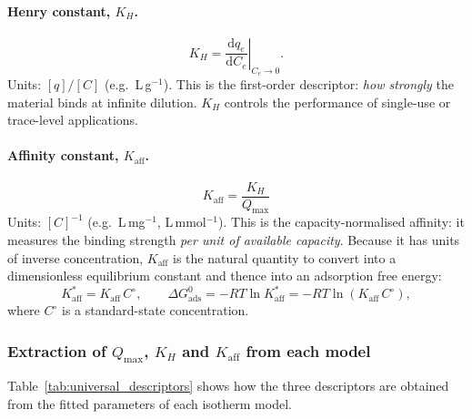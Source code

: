 	\paragraph{Henry constant, $K_H$.}
	\begin{equation}
		K_H = \left.\frac{\mathrm{d}q_e}{\mathrm{d}C_e}
		\right|_{C_e \to 0}.
		\label{eq:KH_universal}
	\end{equation}
	Units: $[q]/[C]$ (e.g.\ L\,g$^{-1}$).
	This is the first-order descriptor: \emph{how strongly} the
	material binds at infinite dilution.  $K_H$ controls the
	performance of single-use or trace-level applications.

	\paragraph{Affinity constant, $K_{\mathrm{aff}}$.}
	\begin{equation}
		\boxed{
			K_{\mathrm{aff}}
			= \frac{K_H}{Q_{\max}}
		}
		\label{eq:Kaff_universal}
	\end{equation}
	Units: $[C]^{-1}$ (e.g.\ L\,mg$^{-1}$, L\,mmol$^{-1}$).
	This is the capacity-normalised affinity: it measures the binding
	strength \emph{per unit of available capacity}.  Because it has
	units of inverse concentration, $K_{\mathrm{aff}}$ is the natural
	quantity to convert into a dimensionless equilibrium constant and
	thence into an adsorption free energy:
	\begin{equation}
		K_{\mathrm{aff}}^{\ast}
		= K_{\mathrm{aff}}\, C^\circ,
		\qquad
		\Delta G_{\mathrm{ads}}^{0}
		= -RT\ln K_{\mathrm{aff}}^{\ast}
		= -RT\ln(K_{\mathrm{aff}}\, C^\circ),
		\label{eq:DG_from_Kaff}
	\end{equation}
	where $C^\circ$ is a standard-state concentration.

	\subsubsection{Extraction of $Q_{\max}$, $K_H$ and $K_{\mathrm{aff}}$ from each model}

	Table~\ref{tab:universal_descriptors} shows how the three
	descriptors are obtained from the fitted parameters of each
	isotherm model.

